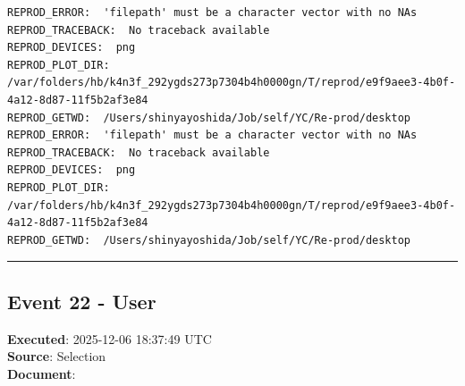 \documentclass[
  11pt,
]{article}
\newenvironment{rpoutput}{\vspace{0.5em}\begin{snugshade}}{\end{snugshade}}
\begin{document}
\begin{rpoutput}

\begin{verbatim}
REPROD_ERROR:  'filepath' must be a character vector with no NAs 
REPROD_TRACEBACK:  No traceback available  
REPROD_DEVICES:  png 
REPROD_PLOT_DIR:  /var/folders/hb/k4n3f_292ygds273p7304b4h0000gn/T/reprod/e9f9aee3-4b0f-4a12-8d87-11f5b2af3e84 
REPROD_GETWD:  /Users/shinyayoshida/Job/self/YC/Re-prod/desktop 
REPROD_ERROR:  'filepath' must be a character vector with no NAs 
REPROD_TRACEBACK:  No traceback available  
REPROD_DEVICES:  png 
REPROD_PLOT_DIR:  /var/folders/hb/k4n3f_292ygds273p7304b4h0000gn/T/reprod/e9f9aee3-4b0f-4a12-8d87-11f5b2af3e84 
REPROD_GETWD:  /Users/shinyayoshida/Job/self/YC/Re-prod/desktop 
\end{verbatim}

\end{rpoutput}

\begin{center}\rule{0.5\linewidth}{0.5pt}\end{center}

\subsection{Event 22 - User}\label{event-22---user}

\textbf{Executed}: 2025-12-06 18:37:49 UTC\\
\textbf{Source}: Selection\\
\textbf{Document}:
\end{document}
